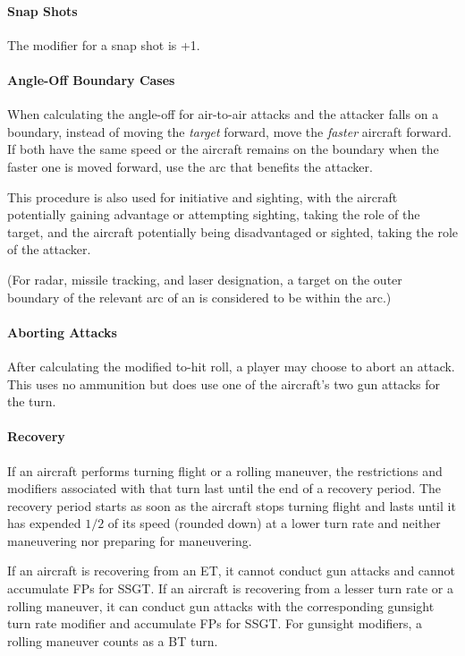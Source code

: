 \documentclass[10pt]{article}
\begin{document}
\paragraph{Snap Shots} The modifier for a snap shot is +1.

\paragraph{Angle-Off Boundary Cases} When calculating the angle-off for air-to-air attacks and the attacker falls on a boundary, instead of moving the \emph{target} forward, move the \emph{faster} aircraft forward. If both have the same speed or the aircraft remains on the boundary when the faster one is moved forward, use the arc that benefits the attacker. 

This procedure is also used for initiative and sighting, with the aircraft potentially gaining advantage or attempting sighting, taking the role of the target, and the aircraft potentially being disadvantaged or sighted, taking the role of the attacker.

(For radar, missile tracking, and laser designation, a target on the outer boundary of the relevant arc of an is considered to be within the arc.)

\paragraph{Aborting Attacks} After calculating the modified to-hit roll, a player may choose to abort an attack. This uses no ammunition but does use one of the aircraft's two gun attacks for the turn.

\paragraph{Recovery} If an aircraft performs turning flight or a rolling maneuver, the restrictions and modifiers associated with that turn last until the end of a recovery period. The recovery period starts as soon as the aircraft stops turning flight and lasts until it has expended $1/2$ of its speed (rounded down) at a lower turn rate and neither maneuvering nor preparing for maneuvering. 

If an aircraft is recovering from an ET, it cannot conduct gun attacks and cannot accumulate FPs for SSGT. If an aircraft is recovering from a lesser turn rate or a rolling maneuver, it can conduct gun attacks with the corresponding gunsight turn rate modifier and accumulate FPs for SSGT. For gunsight modifiers, a rolling maneuver counts as a BT turn.
\end{document}
